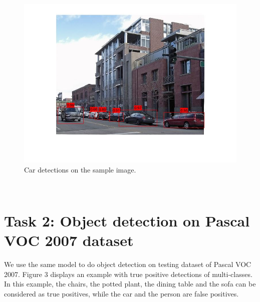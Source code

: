 \documentclass[10pt]{article}
\begin{document}
	\begin{figure}[ht]
		\includegraphics[width=\textwidth]{car_detection.jpg}
		\centering
		\caption{Car detections on the sample image.}
		\label{2}
	\end{figure}\\
\newpage\section*{\large{Task 2: Object detection on Pascal VOC 2007 dataset}}
	We use the same model to do object detection on testing dataset of Pascal VOC 2007. Figure 3 displays an example with true positive detections of multi-classes. In this example, the chairs, the potted plant, the dining table and the sofa can be considered as true positives, while the car and the person are false positives.\\
\end{document}
